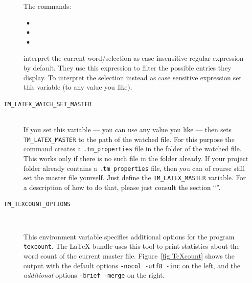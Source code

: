 \documentclass[11pt, x11names]{article}
\begin{document}
\begin{description}
    The commands:

    \begin{itemize}
        \item {}
        \item {}
        \item {}
    \end{itemize}

    interpret the current word/selection as case-insensitive regular expression by default. They use this expression to filter the possible entries they display. To interpret the selection instead as case sensitive expression set this variable (to any value you like).

    \item[\texttt{TM\_LATEX\_WATCH\_SET\_MASTER}]~\\

    If you set this variable — you can use any value you like — then  sets \texttt{TM\_LATEX\_MASTER} to the path of the watched file. For this purpose the command creates a \texttt{.tm\_properties} file in the folder of the watched file. This works only if there is no such file in the folder already. If your project folder already contains a \texttt{.tm\_properties} file, then you can of course still set the master file yourself. Just define the \texttt{TM\_LATEX\_MASTER} variable. For a description of how to do that, please just consult the section “”.

    \item[\texttt{TM\_TEXCOUNT\_OPTIONS}]~\\

    \begin{sloppypar}
    This environment variable specifies additional options for the program \texttt{texcount}. The LaTeX bundle uses this tool to print statistics about the word count of the current master file. Figure~\ref{fig:TeXcount} shows the output with the default options \texttt{-nocol -utf8 -inc} on the left, and the \emph{additional} options \texttt{-brief -merge} on the right.
    \end{sloppypar}


\end{description}
\end{document}
